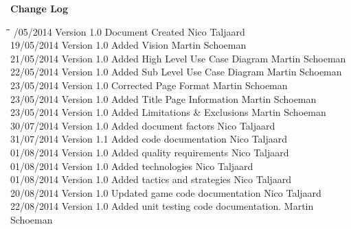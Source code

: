 \documentclass[letterpaper]{article}
\begin{document}
\begin{titlepage}
\begin{center}
\end{center}
\vfill %

\end{titlepage}


	\newpage
		{\LARGE \bf Change Log}\\[2em]
		
		\begin{tabbing}
			\hspace*{2.5cm}\=\hspace*{2.5cm}\=\hspace*{8cm}\=\hspace*{3cm} /05/2014	\> Version 1.0	\> Document Created 							\> Nico Taljaard \\
			19/05/2014  \> Version 1.0  \> Added Vision									\> Martin Schoeman \\
			21/05/2014  \> Version 1.0  \> Added High Level Use Case Diagram			\> Martin Schoeman\\
			22/05/2014  \> Version 1.0  \> Added Sub Level Use Case Diagram				\> Martin Schoeman\\
			23/05/2014  \> Version 1.0  \> Corrected Page Format						\> Martin Schoeman \\
			23/05/2014  \> Version 1.0  \> Added Title Page Information					\> Martin Schoeman \\
			23/05/2014  \> Version 1.0  \> Added Limitations \& Exclusions				\> Martin Schoeman \\
			30/07/2014	\> Version 1.0	\> Added document factors						\> Nico Taljaard \\
			31/07/2014  \> Version 1.1  \> Added code documentation						\> Nico Taljaard\\
			01/08/2014	\> Version 1.0	\> Added quality requirements					\> Nico Taljaard \\
			01/08/2014	\> Version 1.0	\> Added technologies							\> Nico Taljaard \\
			01/08/2014	\> Version 1.0	\> Added tactics and strategies					\> Nico Taljaard \\
			20/08/2014  \> Version 1.0  \> Updated game code documentation				\> Nico Taljaard\\
			22/08/2014  \> Version 1.0  \> Added unit testing code documentation.		\> Martin Schoeman\\

\end{tabbing}
\end{document}
